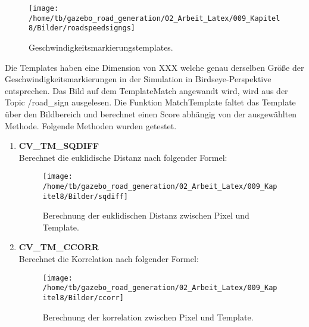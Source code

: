 \begin{figure}[H]
\begin{center}
  \texttt{[image: /home/tb/gazebo\_road\_generation/02\_Arbeit\_Latex/009\_Kapitel8/Bilder/roadspeedsigngs]}%
  \caption[Geschwindigkeitsmarkierungstemplates]%
           {\label{fig:Geschwindigkeitsmarkierungstemplates}%
           Geschwindigkeitsmarkierungstemplates.
           }
\end{center}
\end{figure}

Die Templates haben eine Dimension von XXX welche genau derselben Gr{\"o}{\ss}e der Geschwindigkeitsmarkierungen in der Simulation in Birdseye-Perspektive entsprechen. Das Bild auf dem TemplateMatch angewandt wird, wird aus der Topic /road\_sign ausgelesen.
Die Funktion MatchTemplate faltet das Template {\"u}ber den Bildbereich und berechnet einen Score abh{\"a}ngig von der ausgew{\"a}hlten Methode. Folgende Methoden wurden getestet.

\begin{enumerate}

\item[] \textbf{CV\_TM\_SQDIFF}\hfill \\
Berechnet die euklidische Distanz nach folgender Formel:

\begin{figure}[H]
\begin{center}
  \texttt{[image: /home/tb/gazebo\_road\_generation/02\_Arbeit\_Latex/009\_Kapitel8/Bilder/sqdiff]}%
  \caption[SQDIFF]%
           {\label{fig:SQDIFF}%
           Berechnung der euklidischen Distanz zwischen Pixel und Template.
           }
\end{center}
\end{figure}


\item[] \textbf{CV\_TM\_CCORR}\hfill \\
Berechnet die Korrelation nach folgender Formel:

\begin{figure}[H]
\begin{center}
  \texttt{[image: /home/tb/gazebo\_road\_generation/02\_Arbeit\_Latex/009\_Kapitel8/Bilder/ccorr]}%
  \caption[CCORR]%
           {\label{fig:CCORR}%
           Berechnung der korrelation zwischen Pixel und Template.
           }
\end{center}
\end{figure}

\end{enumerate}

